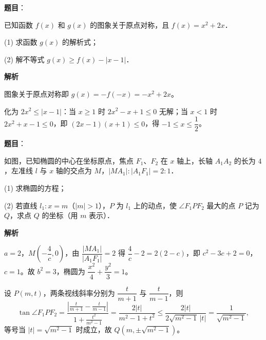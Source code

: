 \begin{answer}

\textbf{题目}：

已知函数 $f(x)$ 和 $g(x)$ 的图象关于原点对称，且 $f(x) = x^2 + 2x$．

(1) 求函数 $g(x)$ 的解析式；

(2) 解不等式 $g(x) \geqslant f(x) - |x - 1|$．

\textbf{解析}


图象关于原点对称即 $g(x) = -f(-x) = -x^2 + 2x$。


化为 $2x^2 \leqslant |x - 1|$：当 $x \geqslant 1$ 时 $2x^2 - x + 1 \leqslant 0$ 无解；当 $x < 1$ 时 $2x^2 + x - 1 \leqslant 0$，即 $(2x - 1)(x + 1) \leqslant 0$，得 $-1 \leqslant x \leqslant \dfrac{1}{2}$。



\end{answer}
\begin{answer}

\textbf{题目}：

如图，已知椭圆的中心在坐标原点，焦点 $F_1$、$F_2$ 在 $x$ 轴上，长轴 $A_1A_2$ 的长为 $4$，左准线 $l$ 与 $x$ 轴的交点为 $M$，$|MA_1| : |A_1F_1| = 2:1$．

(1) 求椭圆的方程；

(2) 若直线 $l_1: x = m$（$|m| > 1$），$P$ 为 $l_1$ 上的动点，使 $\angle F_1PF_2$ 最大的点 $P$ 记为 $Q$，求点 $Q$ 的坐标（用 $m$ 表示）．
\nopagebreak[4]
\begin{center}\end{center}
\nopagebreak[4]
\textbf{解析}


$a = 2$，$M\left(-\dfrac{4}{c}, 0\right)$，由 $\dfrac{|MA_1|}{|A_1F_1|} = 2$ 得 $\dfrac{4}{c} - 2 = 2(2 - c)$，即 $c^2 - 3c + 2 = 0$，$c = 1$。故 $b^2 = 3$，椭圆为 $\dfrac{x^2}{4} + \dfrac{y^2}{3} = 1$。


设 $P(m, t)$，两条视线斜率分别为 $\dfrac{t}{m + 1}$ 与 $\dfrac{t}{m - 1}$，则
\nopagebreak[4]
\[
\tan\angle F_1PF_2 = \frac{\left|\frac{t}{m + 1} - \frac{t}{m - 1}\right|}{1 + \frac{t^2}{m^2 - 1}} = \frac{2|t|}{m^2 - 1 + t^2} \leqslant \frac{2|t|}{2\sqrt{m^2 - 1}\,|t|} = \frac{1}{\sqrt{m^2 - 1}},
\]
等号当 $|t| = \sqrt{m^2 - 1}$ 时成立，故 $Q\left(m, \pm\sqrt{m^2 - 1}\right)$。



\end{answer}
